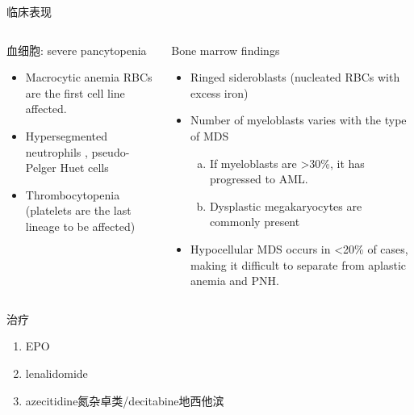 \documentclass[
  ignorenonframetext,
]{beamer}
\begin{document}
\begin{frame}
\begin{block}{临床表现}
\protect\hypertarget{ux4e34ux5e8aux8868ux73b0-4}{}
\begin{columns}[T]
\begin{column}{0.3\textwidth}
\begin{block}{血细胞: severe pancytopenia}
\protect\hypertarget{ux8840ux7ec6ux80de-severe-pancytopenia}{}
\begin{itemize}
\item
  Macrocytic anemia RBCs are the first cell line affected.
\item
  Hypersegmented neutrophils , pseudo-Pelger Huet cells
\item
  Thrombocytopenia (platelets are the last lineage to be affected)
\end{itemize}
\end{block}
\end{column}

\begin{column}{0.3\textwidth}
\begin{block}{Bone marrow findings}
\protect\hypertarget{bone-marrow-findings}{}
\begin{itemize}
\item
  Ringed sideroblasts (nucleated RBCs with excess iron)
\item
  Number of myeloblasts varies with the type of MDS

  \begin{enumerate}
  [(a)]
  \item
    If myeloblasts are \textgreater30\%, it has progressed to AML.
  \item
    Dysplastic megakaryocytes are commonly present
  \end{enumerate}
\item
  Hypocellular MDS occurs in \textless20\% of cases, making it difficult
  to separate from aplastic anemia and PNH.
\end{itemize}
\end{block}
\end{column}
\end{columns}
\end{block}
\end{frame}

\begin{frame}
\begin{block}{治疗}
\protect\hypertarget{ux6cbbux7597-5}{}
\begin{enumerate}
\item
  EPO
\item
  lenalidomide
\item
  azecitidine氮杂卓类/decitabine地西他滨
\end{enumerate}
\end{block}
\end{frame}
\end{document}
